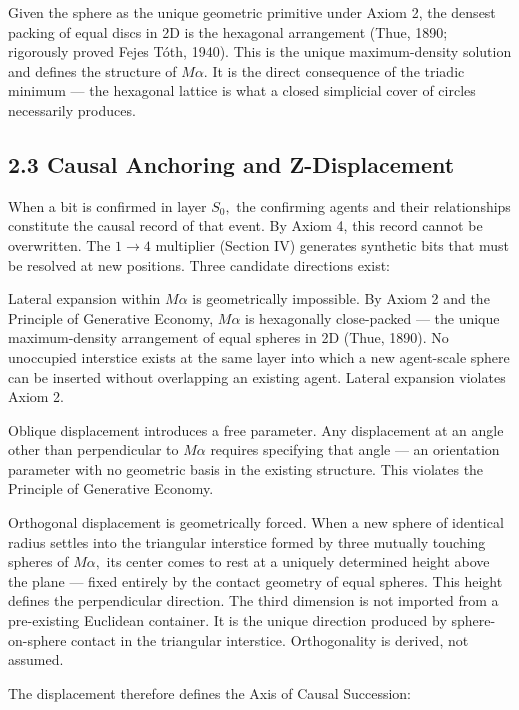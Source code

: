 \documentclass[11pt,oneside]{report}
\theoremstyle{definition}
\theoremstyle{remark}
\begin{document}
Given the sphere as the unique geometric primitive under Axiom 2, the
densest packing of equal discs in 2D is the hexagonal arrangement (Thue,
1890; rigorously proved Fejes Tóth, 1940). This is the unique
maximum-density solution and defines the structure of \ensuremath{M\alpha .} It is the
direct consequence of the triadic minimum --- the hexagonal lattice is
what a closed simplicial cover of circles necessarily produces.

\subsection*{2.3 Causal Anchoring and Z-Displacement}

When a bit is confirmed in layer \ensuremath{S_{0},} the confirming agents and their
relationships constitute the causal record of that event. By Axiom 4,
this record cannot be overwritten. The \ensuremath{1\to 4} multiplier (Section IV)
generates synthetic bits that must be resolved at new positions. Three
candidate directions exist:

Lateral expansion within \ensuremath{M\alpha} is geometrically impossible. By Axiom 2 and
the Principle of Generative Economy, \ensuremath{M\alpha} is hexagonally close-packed ---
the unique maximum-density arrangement of equal spheres in 2D (Thue,
1890). No unoccupied interstice exists at the same layer into which a
new agent-scale sphere can be inserted without overlapping an existing
agent. Lateral expansion violates Axiom 2.

Oblique displacement introduces a free parameter. Any displacement at an
angle other than perpendicular to \ensuremath{M\alpha} requires specifying that angle ---
an orientation parameter with no geometric basis in the existing
structure. This violates the Principle of Generative Economy.

Orthogonal displacement is geometrically forced. When a new sphere of
identical radius settles into the triangular interstice formed by three
mutually touching spheres of \ensuremath{M\alpha ,} its center comes to rest at a uniquely
determined height above the plane --- fixed entirely by the contact
geometry of equal spheres. This height defines the perpendicular
direction. The third dimension is not imported from a pre-existing
Euclidean container. It is the unique direction produced by
sphere-on-sphere contact in the triangular interstice. Orthogonality is
derived, not assumed.

The displacement therefore defines the Axis of Causal Succession:
\end{document}
